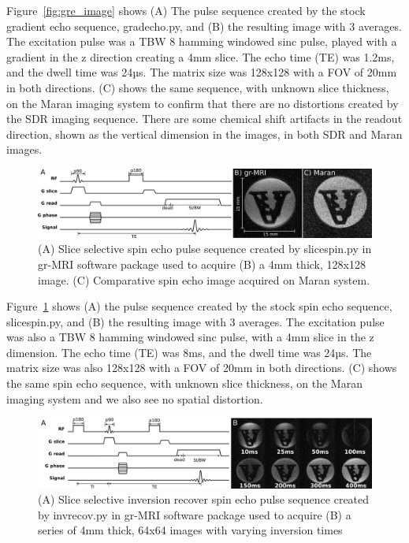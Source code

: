 \documentclass[review]{elsarticle}
\renewcommand{\textcolor}[1]{}
\begin{document}
\indent Figure~\ref{fig:gre_image} shows (A) The pulse sequence created by the stock gradient echo sequence, gradecho.py, and (B) the resulting image with 3 averages.  The excitation pulse was a TBW 8 hamming windowed sinc pulse, played with a gradient in the z direction creating a 4mm slice.  The echo time (TE) was 1.2ms, and the dwell time was 24µs.  The matrix size was 128x128 with a FOV of 20mm in both directions. (C) shows the same sequence, with unknown slice thickness, on the Maran imaging system to confirm that there are no distortions created by the SDR imaging sequence.  There are some chemical shift artifacts in the readout direction, shown as the vertical dimension in the images, in both SDR and Maran images.

\begin{figure}[!ht]
\begin{center}
\includegraphics[width = 1\textwidth,trim=0 0 0 0,clip=false]{se_results.png}
\caption{\textcolor{black}{(A) Slice selective spin echo pulse sequence created by slicespin.py in gr-MRI software package used to acquire (B) a 4mm thick, 128x128 image. (C) Comparative spin echo image acquired on Maran system.}}
\label{fig:se_image}
\end{center}
\end{figure}

\indent Figure~\ref{fig:se_image} shows (A) the pulse sequence created by the stock spin echo sequence, slicespin.py, and (B) the resulting image with 3 averages.  The excitation pulse was also a TBW 8 hamming windowed sinc pulse, with a 4mm slice in the z dimension.  The echo time (TE) was 8ms, and the dwell time was 24µs.  The matrix size was also 128x128 with a FOV of 20mm in both directions. (C) shows the same spin echo sequence, with unknown slice thickness, on the Maran imaging system and we also see no spatial distortion.

\begin{figure}[!ht]
\begin{center}
\includegraphics[width = 1\textwidth,trim=0 0 0 0,clip=false]{ir_results.png}
\caption{\textcolor{black}{(A) Slice selective inversion recover spin echo pulse sequence created by invrecov.py in gr-MRI software package used to acquire (B) a series of 4mm thick, 64x64 images with varying inversion times}}
\label{fig:ir_image}
\end{center}
\end{figure}
\end{document}
